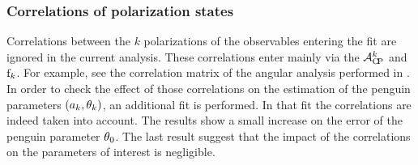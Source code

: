 \subsubsection{Correlations of polarization states}
Correlations between the $k$ polarizations of the observables entering the \chisq fit are ignored in the
current analysis. These correlations enter mainly via the $\mathcal{A}_{\rm C\!P}^{k}$ and $\text{f}_{k}$. For example, see the
correlation matrix  of the angular analysis performed in .
In order to check the effect of those correlations on the estimation of the penguin parameters $(a_k,\theta_k)$,
an additional \chisq fit is performed. In that fit the correlations are indeed taken into account.
The results show a small increase on the error of the penguin parameter $\theta_{0}$.
The last result suggest that the impact of the correlations on the parameters of interest is negligible.
